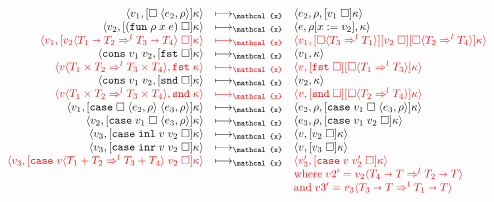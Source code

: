 \documentclass[acmsmall,review,anonymous]{acmart}\settopmatter{printfolios=true,printccs=false,printacmref=false}
\newcommand{\plus}[0]{+}
\newcommand{\sOOinspect}[3]{\langle#1,#2,#3\rangle}
\newcommand{\sOOreturn}[2]{\langle#1,#2\rangle}
\newcommand{\POOfun}[2]{#1 \shortrightarrow #2}
\newcommand{\POOprod}[2]{#1 \times #2}
\newcommand{\POOsum}[2]{#1 \plus #2}
\newcommand{\cOOcast}[3]{#1 \Rightarrow^{#2} #3}
\newcommand{\vOOcast}[2]{#1\langle#2\rangle}
\newcommand{\vOOfun}[3]{\mathtt{fun} \; #1 \; #2 \; #3}
\newcommand{\vOOcons}[2]{\mathtt{cons}\;#1\;#2}
\newcommand{\vOOinl}[1]{\mathtt{inl}\;#1}
\newcommand{\vOOinr}[1]{\mathtt{inr}\;#1}
\newcommand{\kOOappI}[3]{
  [\square \; \langle#1,#2\rangle]#3
}
\newcommand{\kOOappII}[2]{
  [#1 \; \square]#2}
\newcommand{\kOOcar}[1]{[\mathtt{fst} \; \square]#1}
\newcommand{\kOOcdr}[1]{[\mathtt{snd} \; \square]#1}
\newcommand{\kOOcaseI}[4]{
  [\mathtt{case} \; \square \; \langle#1,#3\rangle \; \langle#2,#3\rangle ]#4}
\newcommand{\kOOcaseII}[4]{
  [\mathtt{case} \; #1 \; \square \; \langle#2,#3\rangle ]#4}
\newcommand{\kOOcaseIII}[3]{
  [\mathtt{case} \; #1 \; #2 \; \square]#3}
\newcommand{\kOOcast}[2]{
  [\square \langle #1 \rangle]#2}
\newcommand{\redrule}[3]{#1 & \longmapsto_\mathcal{x} & #2 & #3\\}
\newcommand{\hiredrule}[3]{\highlight{#1} & \highlight{\longmapsto_\mathcal{x}} 
& \highlight{#2} & \highlight{#3} \\}
\newcommand{\highlight}[1]{{\color{red} #1}}
\begin{document}
\begin{figure}
\[\begin{array}{rclr}
\redrule{
\sOOreturn{v_1}{\kOOappI{e_2}{\rho}{\kappa}}}{
\sOOinspect{e_2}{\rho}{\kOOappII{v_1}{\kappa}}}{}

\redrule{
\sOOreturn{v_2}{\kOOappII{(\vOOfun{\rho}{x}{e})}{\kappa}}}{
\sOOinspect{e}{\rho[x:=v_2]}{\kappa}}{}
  \hiredrule{
    \sOOreturn{v_1}{
      \kOOappII{\vOOcast{v_2}{
          \cOOcast{\POOfun{T_1}{T_2}}{l}{\POOfun{T_3}{T_4}}
      }}{\kappa}
    }
  }{
    \sOOreturn{v_1}{
      \kOOcast{\cOOcast{T_3}{l}{T_1}}{
        \kOOappII{v_2}{
          \kOOcast{\cOOcast{T_2}{l}{T_4}}{\kappa}
        }
      }
    }
  }{}
  \redrule{
  \sOOreturn{
    \vOOcons{v_1}{v_2}
  }{\kOOcar{\kappa}}
  }{
  \sOOreturn{v_1}{\kappa}
  }{}
  \hiredrule{
    \sOOreturn{
      \vOOcast{v}{\cOOcast{\POOprod{T_1}{T_2}}{l}{
          \POOprod{T_3}{T_4}}}
    }{\mathtt{fst} \; \kappa}
  }{
    \sOOreturn{v}{
      \kOOcar{
        \kOOcast{\cOOcast{T_1}{l}{T_3}}{\kappa}
      }}
  }{}
  \redrule{
  \sOOreturn{
  \vOOcons{v_1}{v_2}
  }{\kOOcdr{\kappa}}
  }{
  \sOOreturn{v_2}{\kappa}
  }{}
  
  \hiredrule{
    \sOOreturn{
      \vOOcast{v}{\cOOcast{\POOprod{T_1}{T_2}}{l}{
          \POOprod{T_3}{T_4}}}
    }{\mathtt{snd} \; \kappa}
  }{
    \sOOreturn{v}{
      \kOOcdr{\kOOcast{\cOOcast{T_2}{l}{T_4}}{\kappa}}}
  }{}

\redrule{
\sOOreturn{v_1}{\kOOcaseI{e_2}{e_3}{\rho}{\kappa}}}{
\sOOinspect{e_2}{\rho}{\kOOcaseII{v_1}{e_3}{\rho}{\kappa}}}{}

\redrule{
\sOOreturn{v_2}{\kOOcaseII{v_1}{e_3}{\rho}{\kappa}}}{
\sOOinspect{e_3}{\rho}{
  \kOOcaseIII{v_1}{v_2}{\kappa}
}}{}  

\redrule{
\sOOreturn{v_3}{
  \kOOcaseIII{\vOOinl{v}}{v_2}{\kappa}
}
}{
\sOOreturn{v}{\kOOappII{v_2}{\kappa}}
}{}

\redrule{
  \sOOreturn{v_3}{
    \kOOcaseIII{\vOOinr{v}}{v_2}{\kappa}
  }
}{
\sOOreturn{v}{\kOOappII{v_3}{\kappa}}
}{}

\redrule{
  \highlight{\sOOreturn{v_3}{
    \kOOcaseIII{
        \vOOcast{v}{\cOOcast{\POOsum{T_1}{T_2}}{l}{\POOsum{T_3}{T_4}}}
      }{v_2}{\kappa}
  }}
}{
  \highlight{\sOOreturn{v_3'}{
      \kOOcaseIII{v}{v_2'}{\kappa}
  }}
}{\\&&
\highlight{\text{where}\;
v2' = \vOOcast{v_2}{\cOOcast{\POOfun{T_4}{T}}{l}{\POOfun{T_2}{T}}}}
\\&&
\highlight{\text{and}\;
v3' = \vOOcast{v_3}{\cOOcast{\POOfun{T_3}{T}}{l}{\POOfun{T_1}{T}}}}
}
  

\end{array}\]
\end{figure}
\end{document}
